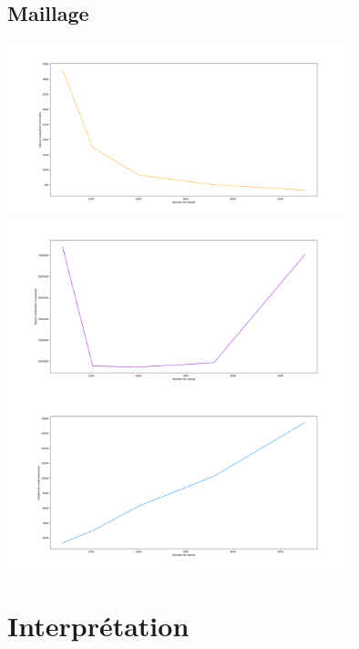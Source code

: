 \documentclass{article}
\begin{document}
\subsection{Maillage}
\begin{center}
    \includegraphics[width = 10cm]{influences/plots/ref_min.png}
    \includegraphics[width = 10cm]{influences/plots/ref_max.png}
    \includegraphics[width = 10cm]{influences/plots/ref_k.png}
\end{center}

\section{Interprétation}
\end{document}
